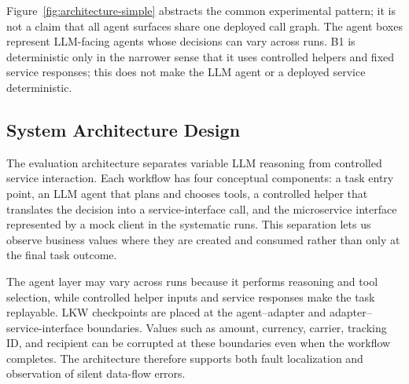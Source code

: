 \documentclass[sigconf,review,anonymous,balance=false]{acmart}
\begin{document}
Figure~\ref{fig:architecture-simple} abstracts the common experimental pattern;
it is not a claim that all agent surfaces share one deployed call graph. The agent boxes
represent LLM-facing agents whose decisions can vary across runs. B1 is
deterministic only in the narrower sense that it uses controlled helpers and
fixed service responses; this does not make the LLM agent or a deployed service
deterministic.

\subsection{System Architecture Design}

The evaluation architecture separates variable LLM reasoning from controlled
service interaction. Each workflow has four conceptual components: a task entry
point, an LLM agent that plans and chooses tools, a controlled helper that
translates the decision into a service-interface call, and the microservice
interface represented by a mock client in the systematic runs. This separation
lets us observe business values where they are created and consumed rather than
only at the final task outcome.

The agent layer may vary across runs because it performs reasoning and tool
selection, while controlled helper inputs and service responses make the task
replayable. LKW checkpoints are placed at the agent--adapter and
adapter--service-interface boundaries. Values such as amount, currency,
carrier, tracking ID, and recipient can be corrupted at these boundaries even
when the workflow completes. The architecture therefore supports both fault
localization and observation of silent data-flow errors.
\end{document}
